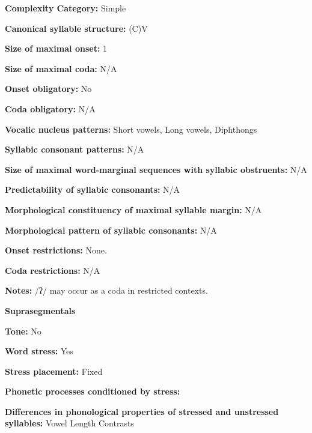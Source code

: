 \textbf{Complexity Category:} Simple



\textbf{Canonical syllable structure:} (C)V \citep[93-95]{Wojtylak2017}



\textbf{Size of maximal onset:} 1



\textbf{Size of maximal coda:} N/A



\textbf{Onset obligatory:} No



\textbf{Coda obligatory:} N/A



\textbf{Vocalic nucleus patterns:} Short vowels, Long vowels, Diphthongs



\textbf{Syllabic consonant patterns:} N/A



\textbf{Size of maximal word{}-marginal sequences with syllabic obstruents:} N/A



\textbf{Predictability of syllabic consonants:} N/A



\textbf{Morphological constituency of maximal syllable margin:} N/A



\textbf{Morphological pattern of syllabic consonants:} N/A



\textbf{Onset restrictions:} None.



\textbf{Coda restrictions:} N/A



\textbf{Notes:} /ʔ/ may occur as a coda in restricted contexts.



\textbf{Suprasegmentals}



\textbf{Tone:} No



\textbf{Word stress:} Yes



\textbf{Stress placement:} Fixed



\textbf{Phonetic processes conditioned by stress:}



\textbf{Differences in phonological properties of stressed and unstressed syllables:} Vowel Length Contrasts



